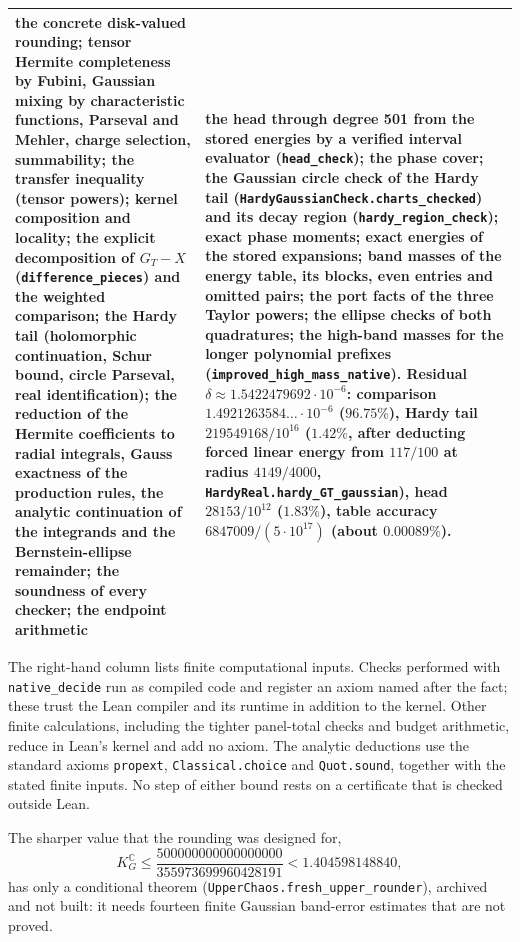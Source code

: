 \documentclass[11pt,a4paper]{article}
\newcommand{\C}{\mathbb{C}}
\newcommand{\KG}{K_G^{\C}}
\newcommand{\lean}[1]{\texttt{\small #1}}
\begin{document}
\begin{center}
\begin{tabular}{@{}>{\raggedright\arraybackslash}p{}>{\raggedright\arraybackslash}p{}@{}}
the concrete disk-valued rounding; tensor Hermite completeness by Fubini, Gaussian mixing by characteristic functions, Parseval and Mehler, charge selection, summability;
the transfer inequality (tensor powers); kernel composition and locality; the explicit decomposition of $G_T-X$
(\lean{difference\_pieces}) and the weighted comparison; the Hardy tail (holomorphic continuation, Schur bound, circle
Parseval, real identification); the reduction of the Hermite coefficients to radial integrals, Gauss exactness of the
production rules, the analytic continuation of the integrands and the Bernstein-ellipse remainder; the soundness of
every checker; the endpoint arithmetic
&
the head through degree 501 from the stored energies by a verified interval evaluator (\lean{head\_check}); the phase
cover; the Gaussian circle check of the Hardy tail (\lean{HardyGaussianCheck.charts\_checked}) and its decay region (\lean{hardy\_region\_check}); exact phase moments; exact energies of the stored
expansions; band masses of the energy table, its blocks, even entries and omitted pairs; the port facts of the three
Taylor powers; the ellipse checks of both quadratures; the high-band masses for the longer polynomial prefixes (\lean{improved\_high\_mass\_native}).
Residual $\delta\approx1.5422479692\cdot10^{-6}$: comparison
$1.4921263584\ldots\cdot10^{-6}$ ($96.75\%$), Hardy tail $219549168/10^{16}$
($1.42\%$, after deducting forced linear energy from $117/100$ at radius
$4149/4000$, \lean{HardyReal.hardy\_GT\_gaussian}), head $28153/10^{12}$ ($1.83\%$),
table accuracy $6847009/(5\cdot10^{17})$ (about $0.00089\%$).\\
\bottomrule
\end{tabular}
\end{center}

The right-hand column lists finite computational inputs. Checks performed with \lean{native\_decide}
run as compiled code and register an axiom named after the fact; these trust the Lean compiler and its runtime
in addition to the kernel. Other finite calculations, including the tighter panel-total checks and budget
arithmetic, reduce in Lean's kernel and add no axiom. The analytic deductions use the standard axioms
\lean{propext}, \lean{Classical.choice} and \lean{Quot.sound}, together with the stated finite inputs.
No step of either bound rests on a certificate that is checked outside Lean.

The sharper value that the rounding was designed for,
\[
 \KG\le\frac{500000000000000000}{355973699960428191}<1.404598148840,
\]
has only a conditional theorem (\lean{UpperChaos.fresh\_upper\_rounder}), archived and not built: it needs
fourteen finite Gaussian band-error estimates that are not proved.
\end{document}
